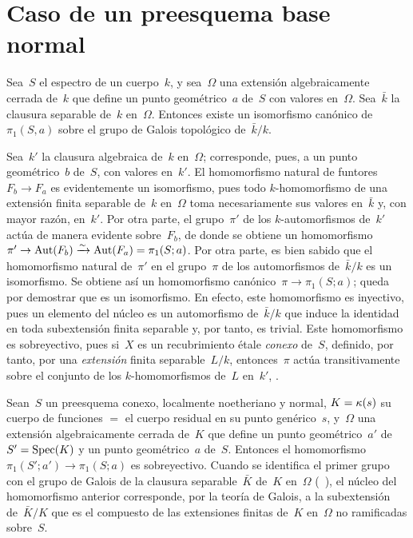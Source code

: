 \section{Caso de un preesquema base normal}
\label{V.8}
%
\begin{proposition}
\label{V.8.1}
Sea~$S$ el espectro de un cuerpo~$k$, y sea~$\Omega$ una extensión
algebraicamente cerrada de~$k$ que define un punto geométrico~$a$ de~$S$
con valores en~$\Omega$. Sea~$\bar{k}$ la clausura separable de~$k$
en~$\Omega$. Entonces existe un isomorfismo canónico de~$\pi_1(S,a)$
sobre el grupo de Galois topológico de~$\bar{k}/k$.
\end{proposition}

Sea~$k'$ la clausura algebraica de~$k$ en~$\Omega$; corresponde, pues, a un
punto geométrico~$b$ de~$S$, con valores en~$k'$. El homomorfismo natural
de funtores~$F_b\to F_a$ es evidentemente un isomorfismo, pues todo
$k$-homomorfismo de una extensión finita separable de~$k$ en~$\Omega$
toma necesariamente sus valores en~$\bar{k}$ y, con mayor razón, en~$k'$.
Por otra parte, el grupo~$\pi'$ de los $k$-automorfismos de~$k'$ actúa de
manera evidente sobre~$F_b$, de donde se obtiene un homomorfismo
$\pi'\to\operatorname{Aut}(F_b)\xrightarrow{\sim}\operatorname{Aut}(F_a)=\pi_1(S;a)$.
Por otra parte, es bien sabido que el homomorfismo natural de~$\pi'$ en el
grupo~$\pi$ de los automorfismos de~$\bar{k}/k$ es un isomorfismo. Se
obtiene así un homomorfismo canónico~$\pi\to\pi_1(S;a)$; queda por demostrar
que es un isomorfismo. En efecto, este homomorfismo es inyectivo, pues un
elemento del núcleo es un automorfismo de~$\bar{k}/k$ que induce la identidad
en toda subextensión finita separable y, por tanto, es trivial. Este
homomorfismo es sobreyectivo, pues si~$X$ es un recubrimiento étale
\emph{conexo} de~$S$, definido, por tanto, por una \emph{extensión} finita
separable~$L/k$, entonces~$\pi$ actúa transitivamente sobre el conjunto de
los $k$-homomorfismos de~$L$ en~$k'$,
.

\begin{proposition}
\label{V.8.2}
Sean~$S$ un preesquema conexo, localmente noetheriano y normal,
$K=\kappa(s)$ su cuerpo de funciones $=$ el cuerpo residual en su punto
genérico~$s$, y~$\Omega$ una extensión algebraicamente cerrada de~$K$ que
define un punto geométrico~$a'$ de~$S'=\operatorname{Spec}(K)$ y un punto geométrico~$a$
de~$S$. Entonces el homomorfismo
$\pi_1(S';a')\to\pi_1(S;a)$ es sobreyectivo. Cuando se identifica el primer
grupo con el grupo de Galois de la clausura separable~$\bar{K}$ de~$K$
en~$\Omega$ (\cf~), el núcleo del homomorfismo anterior
corresponde, por la teoría de Galois, a la subextensión de~$\bar{K}/K$ que
es el compuesto de las extensiones finitas de~$K$ en~$\Omega$ no ramificadas
sobre~$S$.
\end{proposition}

